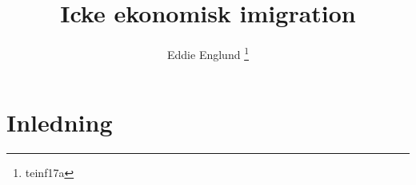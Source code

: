 \documentclass[12pt]{article}
\author{Eddie Englund \thanks{teinf17a}}
\title{Icke ekonomisk imigration}
\begin{document}
    
    \maketitle

    \section{Inledning}

    
\end{document}
